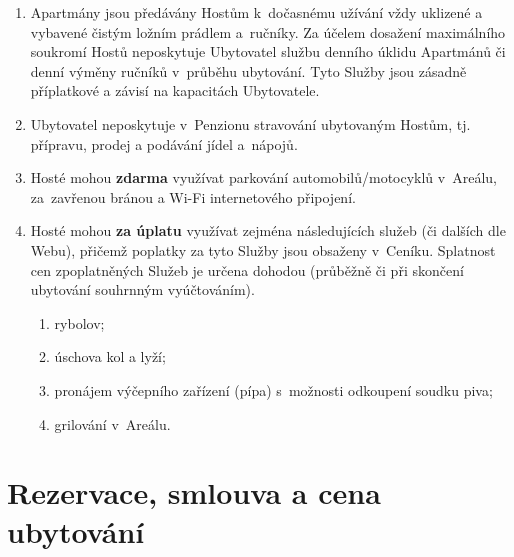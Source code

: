 \documentclass[a4paper]{scrartcl}
\begin{document}
\begin{enumerate}

  \item
        Apartmány jsou předávány Hostům k~dočasnému užívání vždy uklizené a
        vybavené čistým ložním prádlem a~ručníky. Za účelem dosažení
        maximálního soukromí Hostů neposkytuje Ubytovatel službu denního
        úklidu Apartmánů či denní výměny ručníků v~průběhu ubytování. Tyto
        Služby jsou zásadně příplatkové a závisí na kapacitách Ubytovatele.
  \item
        Ubytovatel neposkytuje v~Penzionu stravování ubytovaným Hostům, tj.
        přípravu, prodej a podávání jídel a~nápojů.
  \item
        Hosté mohou \textbf{zdarma} využívat parkování automobilů/motocyklů
        v~Areálu, za~zavřenou bránou a Wi-Fi internetového připojení.
  \item
        Hosté mohou \textbf{za úplatu} využívat zejména následujících služeb
        (či dalších dle Webu), přičemž poplatky za tyto Služby jsou obsaženy
        v~Ceníku. Splatnost cen zpoplatněných Služeb je určena dohodou
        (průběžně či při skončení ubytování souhrnným vyúčtováním).

        \begin{enumerate}

          \item
                rybolov;
          \item
                úschova kol a lyží;
          \item
                pronájem výčepního zařízení (pípa) s~možnosti odkoupení soudku
                piva;
          \item
                grilování v~Areálu.
        \end{enumerate}
\end{enumerate}

\section{Rezervace, smlouva a cena ubytování}
\end{document}
